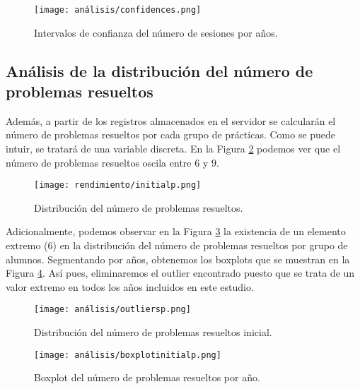 \begin{figure}[H]
    \centering
    \texttt{[image: análisis/confidences.png]}
    \caption{Intervalos de confianza del número de sesiones por años.}
    \label{fig:confidencenumsessions}
\end{figure}

\subsection{Análisis de la distribución del número de problemas resueltos}\label{sec:NumProblems}

Además, a partir de los registros almacenados en el servidor se calcularán el número de problemas resueltos por cada grupo de prácticas. Como se puede intuir, se tratará de una variable discreta. En la Figura \ref{fig:initialp} podemos ver que el número de problemas resueltos oscila entre $6$ y $9$.

\begin{figure}[H]
    \centering
    \texttt{[image: rendimiento/initialp.png]}
    \caption{Distribución del número de problemas resueltos.}
    \label{fig:initialp}
\end{figure}

Adicionalmente, podemos observar en la Figura \ref{fig:outliersp} la existencia de un elemento extremo ($6$) en la distribución del número de problemas resueltos por grupo de alumnos. Segmentando por años, obtenemos los boxplots que se muestran en la Figura \ref{fig:boxplotproblemsyear}. Así pues, eliminaremos el outlier encontrado puesto que se trata de un valor extremo en todos los años incluidos en este estudio.

\begin{figure}[H]
    \centering
    \texttt{[image: análisis/outliersp.png]}
    \caption{Distribución del número de problemas resueltos inicial.}
    \label{fig:outliersp}
\end{figure}

\begin{figure}[H]
    \centering
    \texttt{[image: análisis/boxplotinitialp.png]}
    \caption{Boxplot del número de problemas resueltos por año.}
    \label{fig:boxplotproblemsyear}
\end{figure}